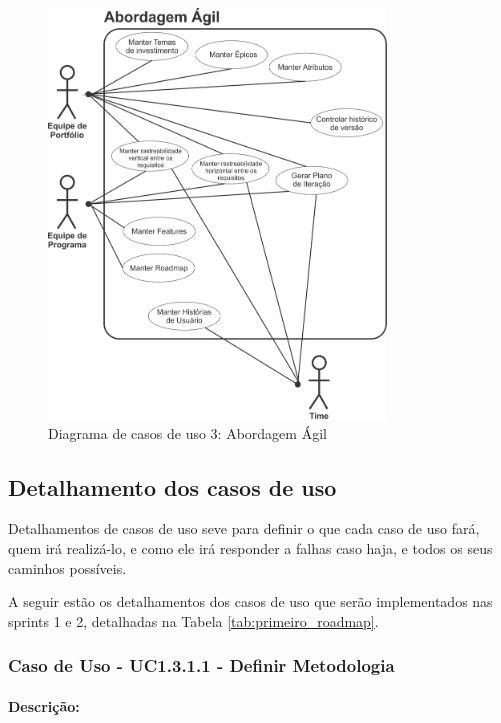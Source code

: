 \begin{figure}[H]
	\centering
	\includegraphics[width=0.8\textwidth]{imgModelagem/DiagramaUC3}
	\caption{Diagrama de casos de uso 3: Abordagem Ágil}
	\label{img:DiagramaUC3}
\end{figure}

\subsection{Detalhamento dos casos de uso}

Detalhamentos de casos de uso seve para definir o que cada caso de uso fará, quem irá realizá-lo, e como ele irá responder a falhas caso haja, e todos os seus caminhos possíveis.

A seguir estão os detalhamentos dos casos de uso que serão implementados nas sprints 1 e 2, detalhadas na Tabela \ref{tab:primeiro_roadmap}.

\subsubsection{Caso de Uso - UC1.3.1.1 - Definir Metodologia}

\paragraph{Descrição:}

